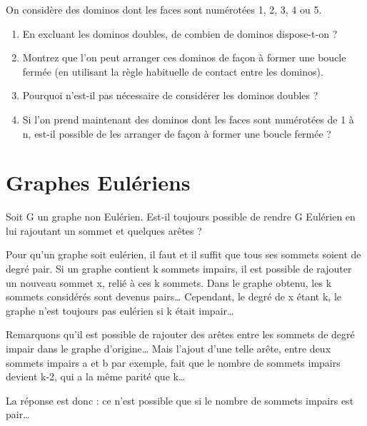 \documentclass{article}[12pt]
\begin{document}
On considère des dominos dont les faces sont numérotées 1, 2, 3, 4 ou 5.

\begin{enumerate}
    \item En excluant les dominos doubles, de combien de dominos dispose-t-on ?
    \item Montrez que l’on peut arranger ces dominos de façon à former une boucle fermée (en utilisant la règle habituelle de contact entre les dominos).
    \item Pourquoi n’est-il pas nécessaire de considérer les dominos doubles ?
    \item Si l’on prend maintenant des dominos dont les faces sont numérotées de 1 à n, est-il possible de les arranger de façon à former une boucle fermée ?
\end{enumerate}

\section*{Graphes Eulériens}

Soit G un graphe non Eulérien. Est-il toujours possible de rendre G Eulérien en lui rajoutant un sommet et quelques arêtes ?


Pour qu’un graphe soit eulérien, il faut et il suffit que tous ses sommets soient de degré pair. Si un graphe contient k sommets impairs, il est possible de rajouter un nouveau sommet x, relié à ces k sommets. Dans le graphe obtenu, les k sommets considérés sont devenus pairs… Cependant, le degré de x étant k, le graphe n’est toujours pas eulérien si k était impair…

Remarquons qu’il est possible de rajouter des arêtes entre les sommets de degré impair dans le graphe d’origine… Mais l’ajout d’une telle arête, entre deux sommets impairs a et b par exemple, fait que le nombre de sommets impairs devient k-2, qui a la même parité que k…

La réponse est donc : ce n’est possible que si le nombre de sommets impairs est pair…
\end{document}
